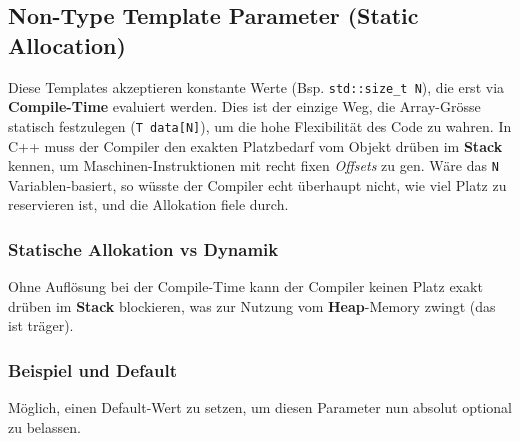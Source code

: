 


\subsection{Non-Type Template Parameter (Static Allocation)}

Diese Templates akzeptieren konstante Werte (Bsp. \texttt{std::size\_t N}), die erst via \textbf{Compile-Time} evaluiert werden. 
Dies ist der einzige Weg, die Array-Grösse statisch festzulegen (\texttt{T data[N]}), um die hohe Flexibilität des Code zu wahren.
In C++ muss der Compiler den exakten Platzbedarf vom Objekt drüben im \textbf{Stack} kennen, um Maschinen-Instruktionen mit recht fixen \textit{Offsets} zu gen.
Wäre das \texttt{N} Variablen-basiert, so wüsste der Compiler echt überhaupt nicht, wie viel Platz zu reservieren ist, und die Allokation fiele durch.
\subsubsection{Statische Allokation vs Dynamik}
Ohne Auflösung bei der Compile-Time kann der Compiler keinen Platz exakt drüben im \textbf{Stack} blockieren, was zur Nutzung vom \textbf{Heap}-Memory zwingt (das ist träger).

\subsubsection{Beispiel und Default}
Möglich, einen Default-Wert zu setzen, um diesen Parameter nun absolut optional zu belassen.



